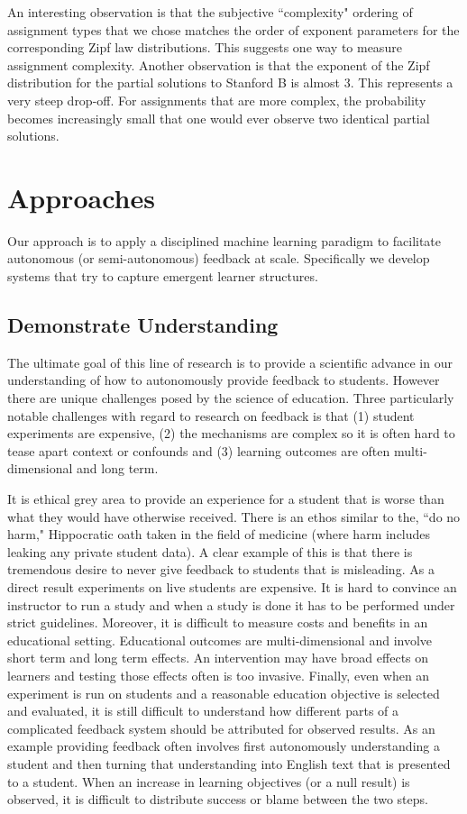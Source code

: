  An interesting observation is that the subjective ``complexity" ordering of assignment types that we chose matches the order of exponent parameters for the corresponding Zipf law distributions. This suggests one way to measure assignment complexity. Another observation is that the exponent of the Zipf distribution for the partial solutions to Stanford B is almost 3. This represents a very steep drop-off. For assignments that are more complex, the probability becomes increasingly small that one would ever observe two identical partial solutions.

\section{Approaches}

Our approach is to apply a disciplined machine learning paradigm to facilitate autonomous (or semi-autonomous) feedback at scale. Specifically we develop systems that try to capture emergent learner structures. 

\subsection{Demonstrate Understanding}

The ultimate goal of this line of research is to provide a scientific advance in our understanding of how to autonomously provide feedback to students. However there are unique challenges posed by the science of education. Three particularly notable challenges with regard to research on feedback is that (1) student experiments are expensive, (2) the mechanisms are complex so it is often hard to tease apart context or confounds and (3) learning outcomes are often multi-dimensional and long term.

It is ethical grey area to provide an experience for a student that is worse than what they would have otherwise received. There is an ethos similar to the, ``do no harm," Hippocratic oath taken in the field of medicine (where harm includes leaking any private student data). A clear example of this is that there is tremendous desire to never give feedback to students that is misleading. As a direct result experiments on live students are expensive. It is hard to convince an instructor to run a study and when a study is done it has to be performed under strict guidelines. Moreover, it is difficult to measure costs and benefits in an educational setting. Educational outcomes are multi-dimensional and involve short term and long term effects. An intervention may have broad effects on learners and testing those effects often is too invasive. Finally, even when an experiment is run on students and a reasonable education objective is selected and evaluated, it is still difficult to understand how different parts of a complicated feedback system should be attributed for observed results. As an example providing feedback often involves first autonomously understanding a student and then turning that understanding into English text that is presented to a student. When an increase in learning objectives (or a null result) is observed, it is difficult to distribute success or blame between the two steps. 

